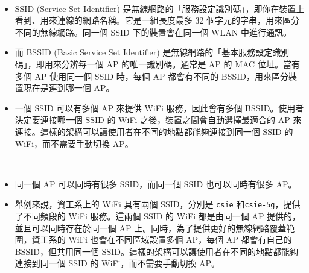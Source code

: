 \documentclass[12pt]{article}
\newenvironment{problem}[2][Problem]{\begin{trivlist}
\item[\hskip \labelsep {\bfseries #1}\hskip \labelsep {\bfseries #2}]}{\end{trivlist}}
\begin{document}
\begin{problem}{1.} 　
  \begin{itemize}
    \item SSID (Service Set Identifier) 是無線網路的「服務設定識別碼」，即你在裝置上看到、用來連線的網路名稱。它是一組長度最多 32 個字元的字串，用來區分不同的無線網路。同一個 SSID 下的裝置會在同一個 WLAN 中進行通訊。
    \item 而 BSSID (Basic Service Set Identifier) 是無線網路的「基本服務設定識別碼」，即用來分辨每一個 AP 的唯一識別碼。通常是 AP 的 MAC 位址。當有多個 AP 使用同一個 SSID 時，每個 AP 都會有不同的 BSSID，用來區分裝置現在是連到哪一個 AP。
    \item 一個 SSID 可以有多個 AP 來提供 WiFi 服務，因此會有多個 BSSID。使用者決定要連接哪一個 SSID 的 WiFi 之後，裝置之間會自動選擇最適合的 AP 來連接。這樣的架構可以讓使用者在不同的地點都能夠連接到同一個 SSID 的 WiFi，而不需要手動切換 AP。
  \end{itemize}
\end{problem}

\begin{problem}{2.} 　
  \begin{itemize}
    \item 同一個 AP 可以同時有很多 SSID，而同一個 SSID 也可以同時有很多 AP。
    \item 舉例來說，資工系上的 WiFi 具有兩個 SSID，分別是 \texttt{csie} 和\texttt{csie-5g}，提供了不同頻段的 WiFi 服務。這兩個 SSID 的 WiFi 都是由同一個 AP 提供的，並且可以同時存在於同一個 AP 上。同時，為了提供更好的無線網路覆蓋範圍，資工系的 WiFi 也會在不同區域設置多個 AP，每個 AP 都會有自己的 BSSID，但共用同一個 SSID。這樣的架構可以讓使用者在不同的地點都能夠連接到同一個 SSID 的 WiFi，而不需要手動切換 AP。
  \end{itemize}
  
\end{problem}

\clearpage
\end{document}
